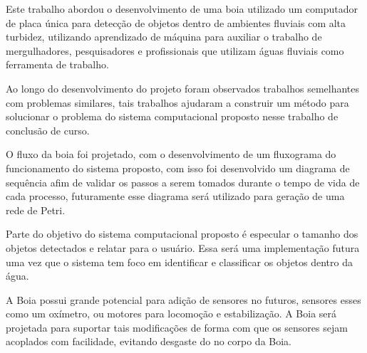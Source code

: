 \label{chapter:consideracoes}

Este trabalho abordou o desenvolvimento de uma boia utilizado um computador de placa única para detecção de objetos dentro de ambientes fluviais com alta turbidez, utilizando aprendizado de máquina para auxiliar o trabalho de mergulhadores, pesquisadores e profissionais que utilizam águas fluviais como ferramenta de trabalho.

Ao longo do desenvolvimento do projeto foram observados trabalhos semelhantes com problemas similares, tais trabalhos ajudaram a construir um método para solucionar o problema do sistema computacional proposto nesse trabalho de conclusão de curso.

O fluxo da boia foi projetado, com o desenvolvimento de um fluxograma do funcionamento do sistema proposto, com isso foi desenvolvido um diagrama de sequência afim de validar os passos a serem tomados durante o tempo de vida de cada processo, futuramente esse diagrama será utilizado para geração de uma rede de Petri.

Parte do objetivo do sistema computacional proposto é especular o tamanho dos objetos detectados e relatar para o usuário. Essa será uma implementação futura uma vez que o sistema tem foco em identificar e classificar os objetos dentro da água.

A Boia possui grande potencial para adição de sensores no futuros, sensores esses como um oxímetro, ou motores para locomoção e estabilização. A Boia será projetada para suportar tais modificações de forma com que os sensores sejam acoplados com facilidade, evitando desgaste do no corpo da Boia.